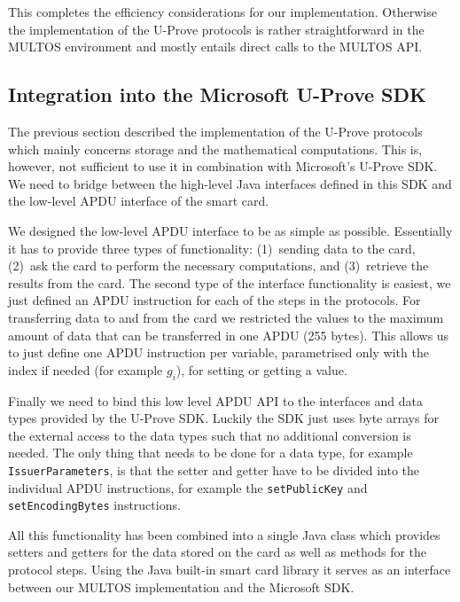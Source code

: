 This completes the efficiency considerations for our implementation. Otherwise
the implementation of the U-Prove protocols is rather straightforward in the
MULTOS environment and mostly entails direct calls to the MULTOS API.

\subsection{Integration into the Microsoft U-Prove SDK}

The previous section described the implementation of the U-Prove protocols
which mainly concerns storage and the mathematical computations. This is, however, not
sufficient to use it in combination with Microsoft's U-Prove SDK. We need to
bridge between the high-level Java interfaces defined in this SDK and the
low-level APDU interface of the smart card.

We designed the low-level APDU interface to be as simple as possible.
Essentially it has to provide three types of functionality:
(1)~sending data to the card,
(2)~ask the card to perform the necessary computations, and
(3)~retrieve the results from the card.
The second type of the interface functionality is easiest,
we just defined an APDU instruction for each
of the steps in the protocols. For transferring data to and from the card we
restricted the values to the maximum amount of data that can be transferred in
one APDU (255 bytes). This allows us to just define one APDU instruction per variable,
parametrised only with the index if needed (for example $g_i$),
for setting or getting a value.

Finally we need to bind this low level APDU API to the interfaces and data types provided
by the U-Prove SDK. Luckily the SDK just uses byte arrays for the external
access to the data types such that no additional conversion is needed. The only thing
that needs to be done for a data type, for example
\lstinline{IssuerParameters}, is that the setter and getter have to be
divided into the individual APDU instructions, for example the
\lstinline{setPublicKey} and \lstinline{setEncodingBytes} instructions.

All this functionality has been combined into a single Java class which provides
setters and getters for the data stored on the card as well as methods for the
protocol steps. Using the Java built-in smart card library it serves as an
interface between our MULTOS implementation and the Microsoft SDK.

